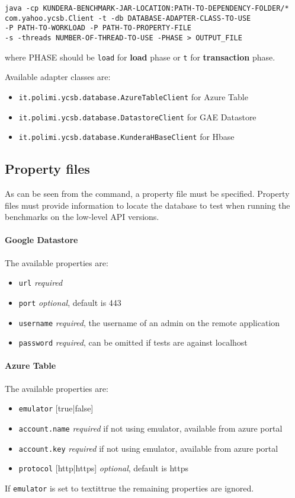\begin{verbatim}
java -cp KUNDERA-BENCHMARK-JAR-LOCATION:PATH-TO-DEPENDENCY-FOLDER/*
com.yahoo.ycsb.Client -t -db DATABASE-ADAPTER-CLASS-TO-USE
-P PATH-TO-WORKLOAD -P PATH-TO-PROPERTY-FILE 
-s -threads NUMBER-OF-THREAD-TO-USE -PHASE > OUTPUT_FILE
\end{verbatim}

\noindent where PHASE should be \texttt{load} for \textbf{load} phase or \texttt{t} for \textbf{transaction} phase.

\newparagraph  Available adapter classes are:
\begin{itemize}
\item \texttt{it.polimi.ycsb.database.AzureTableClient} for Azure Table
\item \texttt{it.polimi.ycsb.database.DatastoreClient} for GAE Datastore
\item \texttt{it.polimi.ycsb.database.KunderaHBaseClient} for Hbase
\end{itemize}

\subsection{Property files}
As can be seen from the command, a property file must be specified. Property files must provide information to locate the database to test when running the benchmarks on the low-level API versions.

\paragraph{Google Datastore} The available properties are:
\begin{itemize}
\item \texttt{url} \textit{required}
\item \texttt{port} \textit{optional}, default is 443
\item \texttt{username} \textit{required}, the username of an admin on the remote application
\item \texttt{password} \textit{required}, can be omitted if tests are against localhost
\end{itemize}

\paragraph{Azure Table} The available properties are:
\begin{itemize}
\item \texttt{emulator} [true|false]
\item \texttt{account.name} \textit{required} if not using emulator, available from azure portal
\item \texttt{account.key} \textit{required} if not using emulator, available from azure portal
\item \texttt{protocol} [http|https] \textit{optional}, default is https
\end{itemize}
\noindent If \texttt{emulator} is set to textit{true} the remaining properties are ignored.

